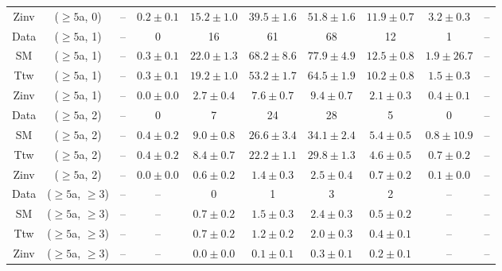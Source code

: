 \begin{table}[h!]
{\begin{tabular}{cccccccccc}
	Zinv & ($\ge5$a, 0) & -- & $0.2\pm 0.1$ & $15.2\pm 1.0$ & $39.5\pm 1.6$ & $51.8\pm 1.6$ & $11.9\pm 0.7$ & $3.2\pm 0.3$ & -- \\[0.5ex] 
	Data & ($\ge5$a, 1) & -- & 0 & 16 & 61 & 68 & 12 & 1 & -- \\[0.5ex] 
	SM & ($\ge5$a, 1) & -- & $0.3\pm 0.1$ & $22.0\pm 1.3$ & $68.2\pm 8.6$ & $77.9\pm 4.9$ & $12.5\pm 0.8$ & $1.9\pm 26.7$ & -- \\[0.5ex] 
	Ttw & ($\ge5$a, 1) & -- & $0.3\pm 0.1$ & $19.2\pm 1.0$ & $53.2\pm 1.7$ & $64.5\pm 1.9$ & $10.2\pm 0.8$ & $1.5\pm 0.3$ & -- \\[0.5ex] 
	Zinv & ($\ge5$a, 1) & -- & $0.0\pm 0.0$ & $2.7\pm 0.4$ & $7.6\pm 0.7$ & $9.4\pm 0.7$ & $2.1\pm 0.3$ & $0.4\pm 0.1$ & -- \\[0.5ex] 
	Data & ($\ge5$a, 2) & -- & 0 & 7 & 24 & 28 & 5 & 0 & -- \\[0.5ex] 
	SM & ($\ge5$a, 2) & -- & $0.4\pm 0.2$ & $9.0\pm 0.8$ & $26.6\pm 3.4$ & $34.1\pm 2.4$ & $5.4\pm 0.5$ & $0.8\pm 10.9$ & -- \\[0.5ex] 
	Ttw & ($\ge5$a, 2) & -- & $0.4\pm 0.2$ & $8.4\pm 0.7$ & $22.2\pm 1.1$ & $29.8\pm 1.3$ & $4.6\pm 0.5$ & $0.7\pm 0.2$ & -- \\[0.5ex] 
	Zinv & ($\ge5$a, 2) & -- & $0.0\pm 0.0$ & $0.6\pm 0.2$ & $1.4\pm 0.3$ & $2.5\pm 0.4$ & $0.7\pm 0.2$ & $0.1\pm 0.0$ & -- \\[0.5ex] 
	Data & ($\ge5$a, $\ge3$) & -- & -- & 0 & 1 & 3 & 2 & -- & -- \\[0.5ex] 
	SM & ($\ge5$a, $\ge3$) & -- & -- & $0.7\pm 0.2$ & $1.5\pm 0.3$ & $2.4\pm 0.3$ & $0.5\pm 0.2$ & -- & -- \\[0.5ex] 
	Ttw & ($\ge5$a, $\ge3$) & -- & -- & $0.7\pm 0.2$ & $1.2\pm 0.2$ & $2.0\pm 0.3$ & $0.4\pm 0.1$ & -- & -- \\[0.5ex] 
	Zinv & ($\ge5$a, $\ge3$) & -- & -- & $0.0\pm 0.0$ & $0.1\pm 0.1$ & $0.3\pm 0.1$ & $0.2\pm 0.1$ & -- & -- \\[0.5ex] 
	\hline
	\hline
\end{tabular}}
\end{table}
